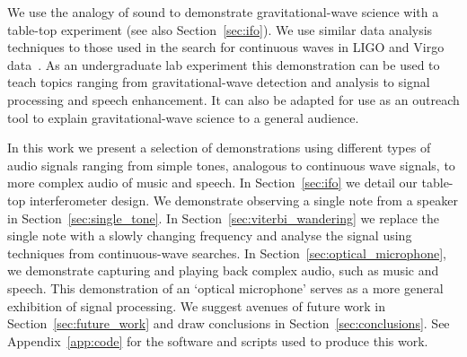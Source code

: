 \documentclass[paper-main.tex]{subfiles}
\begin{document}
We use the analogy of sound to demonstrate gravitational-wave science with a table-top experiment (see also Section~\ref{sec:ifo}). 
We use similar data analysis techniques to those used in the search for continuous waves in LIGO and Virgo data~\cite{ScoX1O2Viterbi:2019,ScoX1ViterbiO1:2017,SuvorovaEtAl:2017,SuvorovaEtAl:2017}.
As an undergraduate lab experiment this demonstration can be used to teach topics ranging from gravitational-wave detection and analysis to signal processing and speech enhancement. 
It can also be adapted for use as an outreach tool to explain gravitational-wave science to a general audience. 


In this work we present a selection of demonstrations using different types of audio signals ranging from simple tones, analogous to continuous wave signals, to more complex audio of music and speech. 
In Section~\ref{sec:ifo} we detail our table-top interferometer design. 
We demonstrate observing a single note from a speaker in Section~\ref{sec:single_tone}.
In Section~\ref{sec:viterbi_wandering} we replace the single note with a slowly changing frequency and analyse the signal using techniques from continuous-wave searches. 
In Section~\ref{sec:optical_microphone}, we demonstrate capturing and playing back complex audio, such as music and speech. 
This demonstration of an `optical microphone' serves as a more general exhibition of signal processing. 
We suggest avenues of future work in Section~\ref{sec:future_work} and draw conclusions in Section~\ref{sec:conclusions}.
See Appendix~\ref{app:code} for the software and scripts used to produce this work. 
\end{document}

